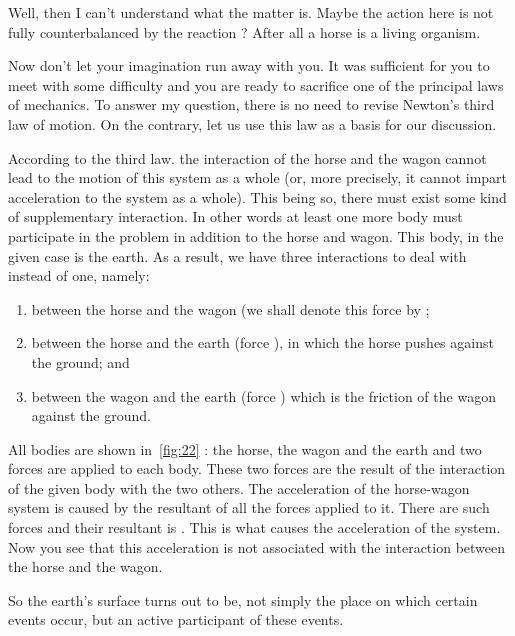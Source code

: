 \begin{s}
Well, then I can't understand what the matter is. Maybe the action here is not fully counterbalanced by the reaction ? After all a horse is a living organism.
\end{s}


\begin{p}
Now don't let your imagination run away with you. It was sufficient for you to meet with some difficulty and you are ready to sacrifice one of the principal laws of mechanics. To answer my question, there is no need to revise Newton's third law of motion. On the contrary, let us use this law as a basis for our discussion.

According to the third law. the interaction of the horse and the wagon cannot lead to the motion of this system as a whole (or, more precisely, it cannot impart acceleration to the system as a whole). This being so, there must exist some kind of supplementary interaction. In other words at least one more body must participate in the problem in addition to the horse and wagon. This body, in the given case is the earth. As a result, we have three interactions to deal with instead of one, namely: 
\begin{enumerate}[label=(\arabic*),leftmargin=1cm]
\item between the horse and the wagon (we shall denote this force by ; 
\item between the horse and the earth (force ), in which the horse pushes against the ground; and 
\item between the wagon and the earth (force ) which is the friction of the wagon against the ground.
\end{enumerate}

All bodies are shown in~\cref{fig:22} : the horse, the wagon and the earth and two forces are applied to each body. These two forces are the result of the interaction of the given body with the two others. The acceleration of the horse-wagon system is caused by the resultant of all the forces applied to it. There are  such forces and their resultant is . This is what causes the acceleration of the system. Now you see that this acceleration is not associated with the interaction between the horse and the wagon.
\end{p}



\begin{s}
So the earth's surface turns out to be, not simply the place on which certain events occur, but an active participant of these events.
\end{s}



